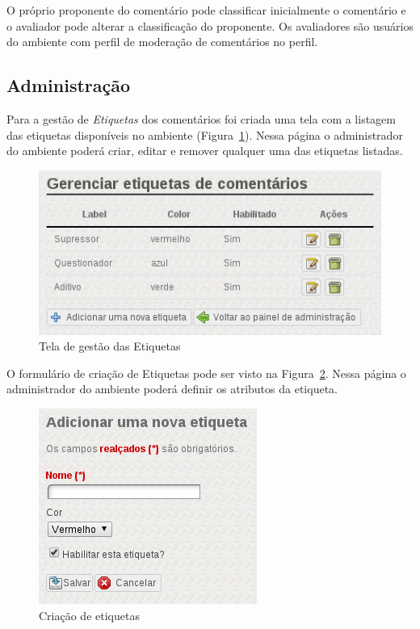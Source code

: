 \documentclass[11pt]{article}
\begin{document}
O próprio proponente do comentário pode classificar inicialmente o
comentário e o avaliador pode alterar a classificação do proponente. Os
avaliadores são usuários do ambiente com perfil de moderação de
comentários no perfil.

\subsection{Administração}

Para a gestão de {\it Etiquetas} dos comentários foi criada uma tela com
a listagem das etiquetas disponíveis no ambiente
(Figura~\ref{fig:plugin-label-admin}). Nessa página o administrador
do ambiente poderá criar, editar e remover qualquer uma das etiquetas
listadas.

\begin{figure}[h]
\center
\includegraphics[scale=0.5]{plugin-label-admin.png}
\caption{Tela de gestão das Etiquetas}
\label{fig:plugin-label-admin}
\end{figure}

O formulário de criação de Etiquetas pode ser visto na
Figura~\ref{fig:new-label-page}. Nessa página o administrador
do ambiente poderá definir os atributos da etiqueta.

\begin{figure}[h]
\center
\includegraphics[scale=0.5]{new-label-page.png}
\caption{Criação de etiquetas}
\label{fig:new-label-page}
\end{figure}
\end{document}
